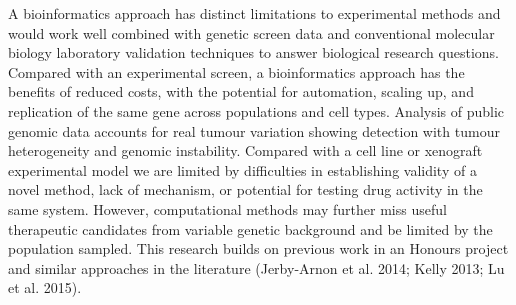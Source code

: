 A \gls{bioinformatics} approach has distinct limitations to experimental methods and would work well combined with genetic screen data and conventional molecular biology laboratory validation techniques to answer biological research questions.  Compared with an experimental screen, a \gls{bioinformatics} approach has the benefits of reduced costs, with the potential for automation, scaling up, and replication of the same gene across populations and cell types.  Analysis of public \gls{genomic} data accounts for real tumour variation showing detection with tumour heterogeneity and genomic instability.  Compared with a cell line or xenograft experimental model we are limited by difficulties in establishing validity of a novel method, lack of mechanism, or potential for testing drug activity in the same system.  However, computational methods may further miss useful therapeutic candidates from variable genetic background and be limited by the population sampled.  This research builds on previous work in an Honours project and similar approaches in the literature (Jerby-Arnon et al. 2014; Kelly 2013; Lu et al. 2015).
\fi